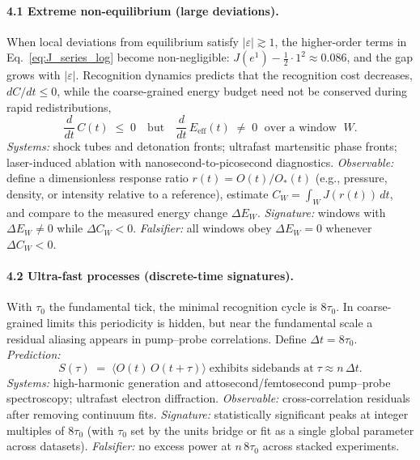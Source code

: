 \documentclass[aps,prx,twocolumn,superscriptaddress,nofootinbib]{revtex4-2}
\newcommand{\Jcost}{J}
\newcommand{\Ccost}{C}
\newcommand{\TauZero}{\tau_{0}}
\begin{document}
\paragraph*{4.1 Extreme non-equilibrium (large deviations).} When local deviations from equilibrium satisfy \(|\varepsilon|\gtrsim 1\), the higher-order terms in Eq.~\eqref{eq:J_series_log} become non-negligible: \(\Jcost(e^{1})-\tfrac12\cdot 1^2\approx 0.086\), and the gap grows with \(|\varepsilon|\). Recognition dynamics predicts that the recognition cost decreases, \(d\Ccost/dt\le 0\), while the coarse-grained energy budget need not be conserved during rapid redistributions,
\begin{equation}\label{eq:non_eq_sig}
  \frac{d}{dt}\,\Ccost(t)\;\le\;0\quad\text{but}\quad \frac{d}{dt}\,E_{\text{eff}}(t)\;\neq\;0\;
  \text{ over a window }\;W.
\end{equation}
\emph{Systems:} shock tubes and detonation fronts; ultrafast martensitic phase fronts; laser-induced ablation with nanosecond-to-picosecond diagnostics. \emph{Observable:} define a dimensionless response ratio \(r(t)=O(t)/O_{\!*}(t)\) (e.g., pressure, density, or intensity relative to a reference), estimate \(\Ccost_W=\int_W\!\Jcost(r(t))\,dt\), and compare to the measured energy change \(\Delta E_W\). \emph{Signature:} windows with \(\Delta E_W\neq 0\) while \(\Delta\Ccost_W<0\). \emph{Falsifier:} all windows obey \(\Delta E_W=0\) whenever \(\Delta\Ccost_W<0\).

\paragraph*{4.2 Ultra-fast processes (discrete-time signatures).} With \(\TauZero\) the fundamental tick, the minimal recognition cycle is \(8\TauZero\). In coarse-grained limits this periodicity is hidden, but near the fundamental scale a residual aliasing appears in pump--probe correlations. Define \(\Delta t=8\TauZero\). \emph{Prediction:}
\begin{equation}\label{eq:aliasing}
  S(\tau)\;=\;\langle O(t)\,O(t+\tau)\rangle\;\text{exhibits sidebands at}\; \tau\approx n\,\Delta t.
\end{equation}
\emph{Systems:} high-harmonic generation and attosecond/femtosecond pump--probe spectroscopy; ultrafast electron diffraction. \emph{Observable:} cross-correlation residuals after removing continuum fits. \emph{Signature:} statistically significant peaks at integer multiples of \(8\TauZero\) (with \(\TauZero\) set by the units bridge or fit as a single global parameter across datasets). \emph{Falsifier:} no excess power at \(n\,8\TauZero\) across stacked experiments.
\end{document}
